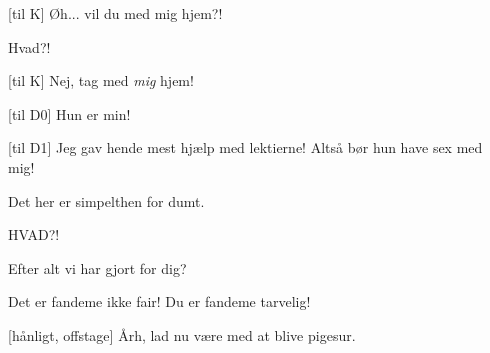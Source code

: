 \documentclass[a4paper,11pt]{article}
\begin{document}
\begin{sketch}
  [til K] Øh... vil du med mig hjem?!

   Hvad?!

  [til K] Nej, tag med \textit{mig} hjem!

  [til D0] Hun er min!

  [til D1] Jeg gav hende mest hjælp med lektierne!  Altså bør
  hun have sex med mig!

   Det her er simpelthen for dumt. 

   HVAD?!

   Efter alt vi har gjort for dig?

   Det er fandeme ikke fair!  Du er fandeme tarvelig!

  [hånligt, offstage] Årh, lad nu være med at blive pigesur.
\end{sketch}
\end{document}

